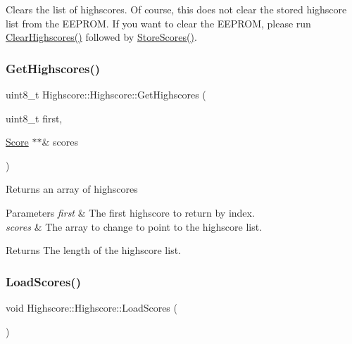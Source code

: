 Clears the list of highscores. Of course, this does not clear the stored highscore list from the E\+E\+P\+R\+OM. If you want to clear the E\+E\+P\+R\+OM, please run \hyperlink{class_highscore_1_1_highscore_ad2d0f11408e3d47c7b8434a71212f6c2}{Clear\+Highscores()} followed by \hyperlink{class_highscore_1_1_highscore_ad0e1b3277228a38513b5c86059ebcd6d}{Store\+Scores()}. \hypertarget{class_highscore_1_1_highscore_af863b0108cf33796e96efa6d0ba613a1}{}\label{class_highscore_1_1_highscore_af863b0108cf33796e96efa6d0ba613a1} 
\subsubsection{\texorpdfstring{Get\+Highscores()}{GetHighscores()}}
{\footnotesize\ttfamily uint8\+\_\+t Highscore\+::\+Highscore\+::\+Get\+Highscores (\begin{DoxyParamCaption}\item[{uint8\+\_\+t}]{first,  }\item[{\hyperlink{struct_highscore_1_1_score}{Score} $\ast$$\ast$\&}]{scores }\end{DoxyParamCaption})}

Returns an array of highscores 
\begin{DoxyParams}{Parameters}
{\em first} & The first highscore to return by index. \\
\hline
{\em scores} & The array to change to point to the highscore list. \\
\hline
\end{DoxyParams}
\begin{DoxyReturn}{Returns}
The length of the highscore list. 
\end{DoxyReturn}
\hypertarget{class_highscore_1_1_highscore_acaba923c4f4acb3c174fb5e325f1bc5e}{}\label{class_highscore_1_1_highscore_acaba923c4f4acb3c174fb5e325f1bc5e} 
\subsubsection{\texorpdfstring{Load\+Scores()}{LoadScores()}}
{\footnotesize\ttfamily void Highscore\+::\+Highscore\+::\+Load\+Scores (\begin{DoxyParamCaption}{ }\end{DoxyParamCaption})}

